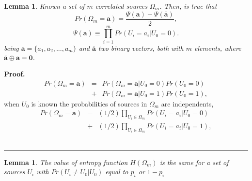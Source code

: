 \documentclass[journal]{IEEEtran}
\newtheorem{lemma}[theorem]{Lemma}
\newenvironment{proof}[1][Proof]{\textbf{#1.} }{\ \rule{0.5em}{0.5em}}
\begin{document}
\begin{lemma}
 \label{lemm:PrA}
Known a set of $m$ correlated  sources  $\Omega_m$. Then, is true that
\begin{equation}\label{eq:PA}
Pr(\Omega_m=\mathbf{a})=\frac{ \Psi(\mathbf{a}) + \Psi(\mathbf{\bar{a}}) }{2},
\end{equation}
\begin{equation}\label{eq:PAequiv}
\Psi(\mathbf{a}) \equiv \prod \limits_{i=1}^{m}{Pr(U_i=a_i|U_0=0)}.
\end{equation}
being $\mathbf{a}=\{a_1, a_2, ..., a_m\}$ and $\mathbf{\bar{a}}$ two 
binary vectors, both with $m$ elements, where $\mathbf{\bar{a}}\oplus \mathbf{a}=\mathbf{0}$. 
\end{lemma}
\begin{proof}
 \label{proof:PrA} 
\begin{equation}\label{eq:PA1}
\begin{matrix}
Pr(\Omega_m=\mathbf{a})&=&Pr(\Omega_m=\mathbf{a}|U_0=0)Pr(U_0=0)\\
~                 &+&Pr(\Omega_m=\mathbf{a}|U_0=1)Pr(U_0=1), 
\end{matrix}
\end{equation}
when $U_0$ is known the probabilities of sources in $\Omega_m$ are independents,
\begin{equation}\label{eq:PA3}
\begin{matrix}
Pr(\Omega_m=\mathbf{a})&=&(1/2)\prod \limits_{U_i\in \Omega_m}{Pr(U_i=a_i|U_0=0)}\\
~                      &+&(1/2)\prod \limits_{U_i\in \Omega_m}{Pr(U_i=a_i|U_0=1)}, 
\end{matrix}
\end{equation}
\end{proof}
\begin{lemma}
 \label{lemm:hpi} 
The value of entropy function $H(\Omega_m)$ is the same for a set of sources
$U_i$ with $Pr(U_i\neq U_0|U_0)$ equal to $p_i$ or $1-p_i$
\end{lemma}
\end{document}
